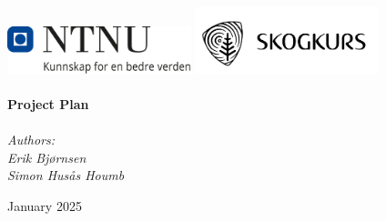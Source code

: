 
\begin{titlepage}
\vbox{ }
\vbox{ }
\begin{center}
\includegraphics[width=0.40\textwidth]{Images/NTNU_logo.png}
\includegraphics[width=0.40\textwidth]{Images/skogkurs_logo_tekst.png}
\\[1cm]

\HRule \\[0.6cm]
{ \huge \bfseries Project Plan}\\[0.4cm]
\HRule \\[1.5cm]

\large
\emph{Authors:}\\
\emph{Erik Bjørnsen}\\
\emph{Simon Husås Houmb}
\vfill

{\large January 2025}
\end{center}
\end{titlepage}